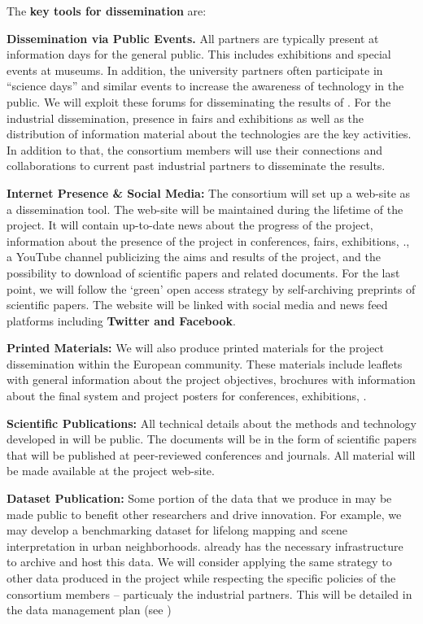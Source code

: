 The \textbf{key tools for dissemination} are:
\begin{denseItemize}
\item {\bf Dissemination via Public Events.} All partners are typically present at information days for the general public. This includes exhibitions and special events at museums. In addition, the university partners often participate in ``science days'' and similar events to increase the awareness of technology in the public. We will exploit these forums for disseminating the results of \Project{}. For the industrial dissemination, presence in fairs and exhibitions as well as the distribution of information material about the \Project{} technologies are the key activities. In addition to that, the consortium members will use their connections and collaborations to current past industrial partners to disseminate the results.  

\item {\bf Internet Presence \& Social Media:} The consortium will set up a web-site as a dissemination tool. The web-site will be maintained during the lifetime of the project. It will contain up-to-date news about the progress of the project, information about the presence of the project in conferences, fairs, exhibitions, \etc., a YouTube channel publicizing the aims and results of the project, and the possibility to download of scientific papers and related documents. For the last point, we will follow the `green' open access strategy by self-archiving preprints of scientific papers. The website will be linked with social media and news feed platforms including {\bf Twitter and Facebook}.

\item {\bf Printed Materials:} We will also produce printed materials for the project dissemination within the European community. These materials include leaflets with general information about the project objectives, brochures with information about the final system and project posters for conferences, exhibitions, \etc.

\item {\bf Scientific Publications:} All technical details about the methods and technology developed in \Project{} will be public. The documents will be in the form of scientific papers that will be published at peer-reviewed conferences and journals. All material will be made available at the project web-site.

\item {\bf Dataset Publication:} Some portion of the data that we produce in \Project{} may be made public to benefit other researchers and drive innovation. For example, we may develop a benchmarking dataset for lifelong mapping and scene interpretation in urban neighborhoods. \ETHZ{} already has the necessary infrastructure to archive and host this data. We will consider applying the same strategy to other data produced in the project while respecting the specific policies of the consortium members -- particualy the industrial partners. This will be detailed in the data management plan (see \WPInnovation)


\end{denseItemize}
